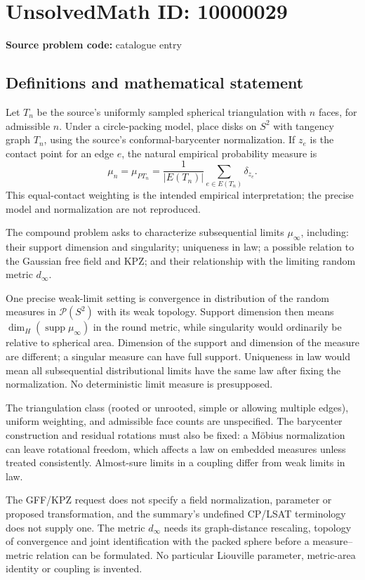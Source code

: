 \documentclass[11pt]{article}
\begin{document}
\section*{UnsolvedMath ID: 10000029}
\textbf{Source problem code:} catalogue entry
\subsection{Definitions and mathematical statement}
Let $T_n$ be the source's uniformly sampled spherical triangulation with $n$ faces, for admissible $n$. Under a circle-packing model, place disks on $S^2$ with tangency graph $T_n$, using the source's conformal-barycenter normalization. If $z_e$ is the contact point for an edge $e$, the natural empirical probability measure is
\[
\mu_n=\mu_{P T_n}=\frac1{|E(T_n)|}\sum_{e\in E(T_n)}\delta_{z_e}.
\]
This equal-contact weighting is the intended empirical interpretation; the precise model and normalization are not reproduced.

The compound problem asks to characterize subsequential limits $\mu_\infty$, including: their support dimension and singularity; uniqueness in law; a possible relation to the Gaussian free field and KPZ; and their relationship with the limiting random metric $d_\infty$.

One precise weak-limit setting is convergence in distribution of the random measures in $\mathcal P(S^2)$ with its weak topology. Support dimension then means $\dim_H(\operatorname{supp}\mu_\infty)$ in the round metric, while singularity would ordinarily be relative to spherical area. Dimension of the support and dimension of the measure are different; a singular measure can have full support. Uniqueness in law would mean all subsequential distributional limits have the same law after fixing the normalization. No deterministic limit measure is presupposed.

The triangulation class (rooted or unrooted, simple or allowing multiple edges), uniform weighting, and admissible face counts are unspecified. The barycenter construction and residual rotations must also be fixed: a Möbius normalization can leave rotational freedom, which affects a law on embedded measures unless treated consistently. Almost-sure limits in a coupling differ from weak limits in law.

The GFF/KPZ request does not specify a field normalization, parameter or proposed transformation, and the summary's undefined CP/LSAT terminology does not supply one. The metric $d_\infty$ needs its graph-distance rescaling, topology of convergence and joint identification with the packed sphere before a measure--metric relation can be formulated. No particular Liouville parameter, metric-area identity or coupling is invented.
\end{document}
